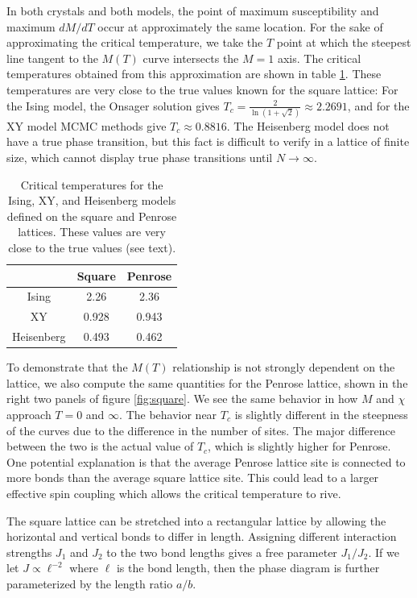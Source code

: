 \documentclass[amsmath,amssymb,aps,twocolumn,nofootinbib]{revtex4-2}
\begin{document}
In both crystals and both models, the point of maximum susceptibility and maximum $dM/dT$ occur at approximately the same location. For the sake of approximating the critical temperature, we take the $T$ point at which the steepest line tangent to the $M(T)$ curve intersects the $M=1$ axis. The critical temperatures obtained from this approximation are shown in table \ref{tab:tc}. These temperatures are very close to the true values known for the square lattice: For the Ising model, the Onsager solution gives $T_c = \frac{2}{\ln(1 + \sqrt{2})} \approx 2.2691$, and for the XY model MCMC methods give $T_c \approx 0.8816$. The Heisenberg model does not have a true phase transition, but this fact is difficult to verify in a lattice of finite size, which cannot display true phase transitions until $N\rightarrow \infty$. 
\begin{table}
  \centering
  \begin{tabular}{c|cc}
    \hline \hline
    & Square & Penrose \\ \hline
    Ising & 2.26 & 2.36\\
    XY & 0.928 & 0.943\\
    Heisenberg & 0.493 & 0.462\\ \hline \hline
  \end{tabular}
  \caption{Critical temperatures for the Ising, XY, and Heisenberg models defined on the square and Penrose lattices. These values are very close to the true values (see text).}
  \label{tab:tc}
\end{table}

To demonstrate that the $M(T)$ relationship is not strongly dependent on the lattice, we also compute the same quantities for the Penrose lattice, shown in the right two panels of figure \ref{fig:square}. We see the same behavior in how $M$ and $\chi$ approach $T=0$ and $\infty$. The behavior near $T_c$ is slightly different in the steepness of the curves due to the difference in the number of sites. The major difference between the two is the actual value of $T_c$, which is slightly higher for Penrose. One potential explanation is that the average Penrose lattice site is connected to more bonds than the average square lattice site. This could lead to a larger effective spin coupling which allows the critical temperature to rive.

The square lattice can be stretched into a rectangular lattice by allowing the horizontal and vertical bonds to differ in length. Assigning different interaction strengths $J_1$ and $J_2$ to the two bond lengths gives a free parameter $J_1/J_2$. If we let $J \propto \ell^{-2}$ where $\ell$ is the bond length, then the phase diagram is further parameterized by the length ratio $a/b$.
\end{document}
